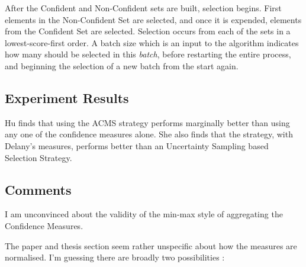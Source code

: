 \documentclass[a4paper,11pt]{report}
\begin{document}
After the Confident and Non-Confident sets are built, selection begins. First elements in the Non-Confident Set are selected, and once it is expended, elements from the Confident Set are selected. Selection occurs from each of the sets in a lowest-score-first order. A batch size which is an input to the algorithm indicates how many should be selected in this \emph{batch}, before restarting the entire process, and beginning the selection of a new batch from the start again.

\subsection{Experiment Results}
Hu finds that using the ACMS strategy performs marginally better than using any one of the confidence measures alone. She also finds that the strategy, with Delany's measures, performs better than an Uncertainty Sampling based Selection Strategy.


\subsection{Comments\label{sec:hu2comments}}
I am unconvinced about the validity of the min-max style of aggregating the Confidence Measures.

The paper and thesis section seem rather unspecific about how the measures are normalised. I'm guessing there are broadly two possibilities :
\end{document}
